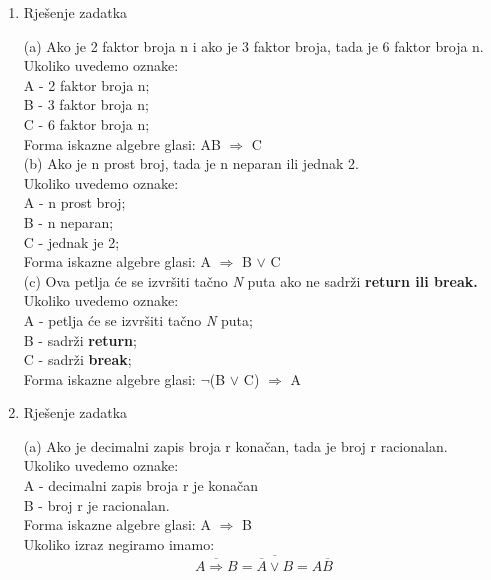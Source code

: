 \documentclass[12pt]{article}
\begin{document}
    
	\begin{enumerate}
		\item Rješenje zadatka
	
		{(a) Ako je 2 faktor broja n i ako je 3 faktor broja, tada je 6 faktor broja n. \\
		
	    Ukoliko uvedemo oznake: \\
		A - 2 faktor broja n; \\
		B - 3 faktor broja n; \\
		C - 6 faktor broja n; \\
		Forma iskazne algebre glasi: AB {$\Rightarrow$} C \\
		
		(b) Ako je n prost broj, tada je n neparan ili jednak 2. \\
		
		Ukoliko uvedemo oznake: \\
		A - n prost broj; \\
		B - n neparan; \\
		C - jednak je 2; \\
		Forma iskazne algebre glasi: A {$\Rightarrow$} B {$\vee$} C \\
		
		(c) Ova petlja će se izvršiti tačno {\textit N} puta ako ne sadrži {\bf return ili break. } \\
		
		Ukoliko uvedemo oznake: \\
		A - petlja će se izvršiti tačno {\textit N} puta; \\
		B - sadrži {\bf return}; \\
		C - sadrži {\bf break}; \\		
		Forma iskazne algebre glasi: {$\neg$}(B {$\vee$} C) {$\Rightarrow$} A} 
		
		\item Rješenje zadatka
		
		{(a) Ako je decimalni zapis broja r konačan, tada je broj r racionalan. \\
		
		Ukoliko uvedemo oznake: \\
		A - decimalni zapis broja r je konačan \\
		B - broj r je racionalan. \\
		Forma iskazne algebre glasi: A {$\Rightarrow$} B \\
		
		Ukoliko izraz negiramo imamo: 		
		\begin{equation*}
		    \overline{A \Rightarrow B}=\overline{\overline{A} \vee B}= A\overline{B} 
		\end{equation*}
		
}
\end{enumerate}
\end{document}
